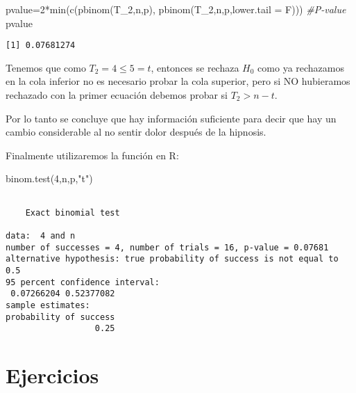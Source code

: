\documentclass[
  a4paper,
  oneside,
  openany]{book}
\newenvironment{Shaded}{\begin{snugshade}}{\end{snugshade}}
\newcommand{\AttributeTok}[1]{\textcolor[rgb]{0.77,0.63,0.00}{#1}}
\newcommand{\CommentTok}[1]{\textcolor[rgb]{0.56,0.35,0.01}{\textit{#1}}}
\newcommand{\DecValTok}[1]{\textcolor[rgb]{0.00,0.00,0.81}{#1}}
\newcommand{\FunctionTok}[1]{\textcolor[rgb]{0.00,0.00,0.00}{#1}}
\newcommand{\NormalTok}[1]{#1}
\newcommand{\OtherTok}[1]{\textcolor[rgb]{0.56,0.35,0.01}{#1}}
\newcommand{\SpecialCharTok}[1]{\textcolor[rgb]{0.00,0.00,0.00}{#1}}
\newcommand{\StringTok}[1]{\textcolor[rgb]{0.31,0.60,0.02}{#1}}
\begin{document}
\begin{Shaded}
\begin{Highlighting}[]
\NormalTok{pvalue}\OtherTok{=}\DecValTok{2}\SpecialCharTok{*}\FunctionTok{min}\NormalTok{(}\FunctionTok{c}\NormalTok{(}\FunctionTok{pbinom}\NormalTok{(T\_2,n,p), }\FunctionTok{pbinom}\NormalTok{(T\_2,n,p,}\AttributeTok{lower.tail =}\NormalTok{ F)))   }\CommentTok{\#P{-}value}
\NormalTok{pvalue}
\end{Highlighting}
\end{Shaded}

\begin{verbatim}
[1] 0.07681274
\end{verbatim}

Tenemos que como \(T_2=4\leq 5 =t\), entonces se rechaza \(H_0\) como ya rechazamos en la cola inferior no es necesario probar la cola superior, pero si NO hubieramos rechazado con la primer ecuación debemos probar si \(T_2>n-t\).

Por lo tanto se concluye que hay información suficiente para decir que hay un cambio considerable al no sentir dolor después de la hipnosis.

Finalmente utilizaremos la función en R:

\begin{Shaded}
\begin{Highlighting}[]
\FunctionTok{binom.test}\NormalTok{(}\DecValTok{4}\NormalTok{,n,p,}\StringTok{"t"}\NormalTok{)}
\end{Highlighting}
\end{Shaded}

\begin{verbatim}

    Exact binomial test

data:  4 and n
number of successes = 4, number of trials = 16, p-value = 0.07681
alternative hypothesis: true probability of success is not equal to 0.5
95 percent confidence interval:
 0.07266204 0.52377082
sample estimates:
probability of success 
                  0.25 
\end{verbatim}

\break

\hypertarget{ejercicios-3}{%
\section{Ejercicios}\label{ejercicios-3}}
\end{document}
